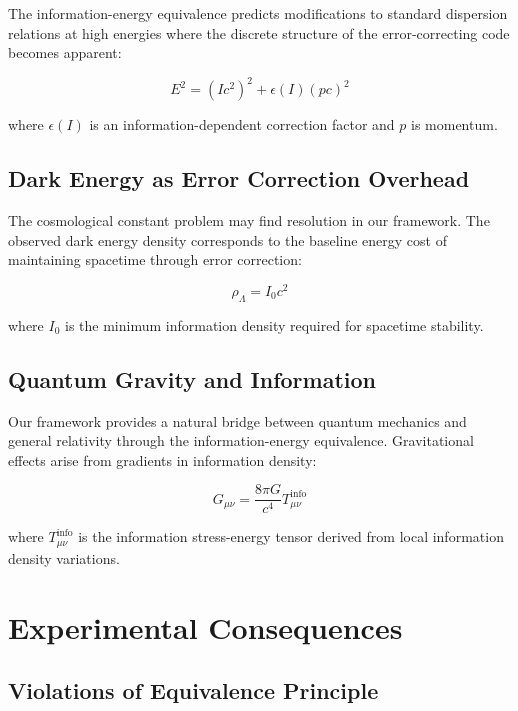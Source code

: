 \documentclass[12pt]{article}
\begin{document}
The information-energy equivalence predicts modifications to standard dispersion relations at high energies where the discrete structure of the error-correcting code becomes apparent:

\begin{equation}
E^2 = (Ic^2)^2 + \epsilon(I) (pc)^2
\end{equation}

where $\epsilon(I)$ is an information-dependent correction factor and $p$ is momentum.

\subsection{Dark Energy as Error Correction Overhead}

The cosmological constant problem may find resolution in our framework. The observed dark energy density corresponds to the baseline energy cost of maintaining spacetime through error correction:

\begin{equation}
\rho_{\Lambda} = I_0 c^2
\end{equation}

where $I_0$ is the minimum information density required for spacetime stability.

\subsection{Quantum Gravity and Information}

Our framework provides a natural bridge between quantum mechanics and general relativity through the information-energy equivalence. Gravitational effects arise from gradients in information density:

\begin{equation}
G_{\mu\nu} = \frac{8\pi G}{c^4} T_{\mu\nu}^{\text{info}}
\end{equation}

where $T_{\mu\nu}^{\text{info}}$ is the information stress-energy tensor derived from local information density variations.

\section{Experimental Consequences}

\subsection{Violations of Equivalence Principle}
\end{document}
